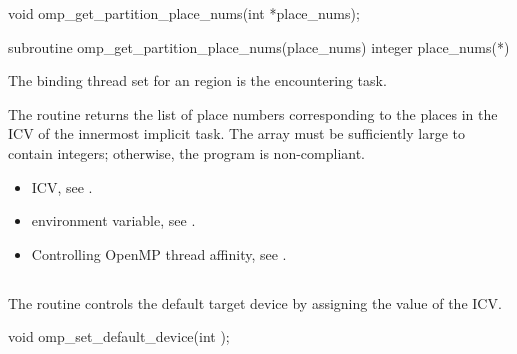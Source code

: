 \format
\ccppspecificstart
\begin{boxedcode}
void omp\_get\_partition\_place\_nums(int *place\_nums);
\end{boxedcode}
\ccppspecificend

\fortranspecificstart
\begin{boxedcode}
subroutine omp\_get\_partition\_place\_nums(place\_nums)
integer place\_nums(*)
\end{boxedcode}
\fortranspecificend

\binding
The binding thread set for an  region is the encountering task.

\effect
The  routine returns the list of place numbers corresponding to the places in the  ICV of the innermost implicit task. The array must be sufficiently large to contain  integers; otherwise, the program is non-compliant.

\crossreferences
\begin{itemize}
\item {} ICV, see 
.

\item {} environment variable, see 
.

\item Controlling OpenMP thread affinity, see 
. 
\end{itemize}





\subsection{}
\label{subsec:omp_set_default_device}

\summary

The  routine controls the default target device by 
assigning the value of the  ICV.

\format
\ccppspecificstart
\begin{boxedcode}
void omp\_set\_default\_device(int );
\end{boxedcode}
\ccppspecificend

